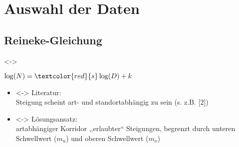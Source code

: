 \section{Auswahl der Daten}
\subsection{Reineke-Gleichung}
\begin{frame}[c]
  \visible<\theFirstElement->{
    \begin{center}
      \begin{minipage}{0.40\textwidth}
        \centerline{\(\mylog(N) = \textcolor{red}{s} \log(D) + k\)}
        \vspace{\captiondistance}
      \end{minipage}
    \end{center}

  }

  \begin{itemize}
  \item<\theSecondElement-> Literatur: \\
    Steigung scheint art- und standortabhängig zu sein (s. z.B. [2])
  \item<\theSecondElement-> Lösungsansatz: \\
    artabhängiger Korridor ,,erlaubter`` Steigungen, begrenzt durch unteren Schwellwert (\(m_u\)) und oberen Schwellwert (\(m_o\))
  \end{itemize}
\end{frame}

